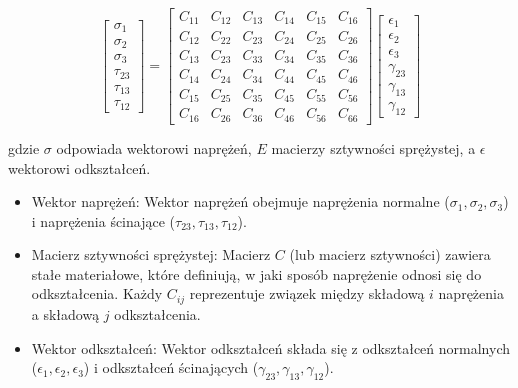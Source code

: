 $$
\begin{bmatrix}
\sigma_1 \\
\sigma_2 \\
\sigma_3 \\
\tau_{23} \\
\tau_{13} \\
\tau_{12}
\end{bmatrix}
=
\begin{bmatrix}
C_{11} & C_{12} & C_{13} & C_{14} & C_{15} & C_{16} \\
C_{12} & C_{22} & C_{23} & C_{24} & C_{25} & C_{26} \\
C_{13} & C_{23} & C_{33} & C_{34} & C_{35} & C_{36} \\
C_{14} & C_{24} & C_{34} & C_{44} & C_{45} & C_{46} \\
C_{15} & C_{25} & C_{35} & C_{45} & C_{55} & C_{56} \\
C_{16} & C_{26} & C_{36} & C_{46} & C_{56} & C_{66}
\end{bmatrix}
\begin{bmatrix}
\epsilon_1 \\
\epsilon_2 \\
\epsilon_3 \\
\gamma_{23} \\
\gamma_{13} \\
\gamma_{12}
\end{bmatrix}
$$

gdzie $\sigma$ odpowiada wektorowi naprężeń, $E$ macierzy sztywności sprężystej, a $\epsilon$ wektorowi odkształceń.
\begin{itemize}

    \item {Wektor naprężeń}: Wektor naprężeń obejmuje naprężenia normalne ($\sigma_1, \sigma_2, \sigma_3$) i naprężenia ścinające ($\tau_{23}, \tau_{13}, \tau_{12}$).
    
    \item {Macierz sztywności sprężystej}: Macierz $C$ (lub macierz sztywności) zawiera stałe materiałowe, które definiują, w jaki sposób naprężenie odnosi się do odkształcenia. Każdy $C_{ij}$ reprezentuje związek między składową $i$ naprężenia a składową $j$ odkształcenia.
    
    \item {Wektor odkształceń}: Wektor odkształceń składa się z odkształceń normalnych ($\epsilon_1, \epsilon_2, \epsilon_3$) i odkształceń ścinających ($\gamma_{23}, \gamma_{13}, \gamma_{12}$).

\end{itemize}

